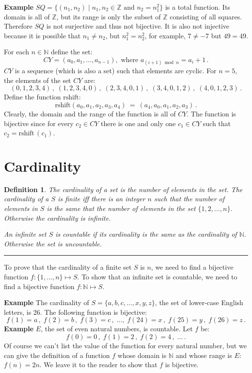 \documentclass[12pt,a4paper]{article}
\newtheorem{definition}[theorem]{Definition}
\newcommand*{\qed}{\hfill\rule[-2pt]{4pt}{10pt}}
\newenvironment{example}{\textbf{Example}}{}
\begin{document}
\begin{example}
$SQ= \{(n_1,n_2)\mid n_1,n_2\in\mathbb{Z} \textrm{\ and\ }  n_2=n_1^2\}$ is a total function. Its domain is all of $\mathbb{Z}$, but its range is
only the subset of $\mathbb{Z}$ consisting of all squares. Therefore
$SQ$ is not surjective and thus not bijective. It is also not injective because it is possible that $n_1 \neq n_2$, but $n_1^2=n_2^2$, for example, $7\neq -7$ but $49=49$.

For each $n\in \mathbb{N}$ define the set:
\[
CY =(a_0,a_1,\ldots,a_{n-1}), \textrm{\ where\ } a_{(i+1)\bmod n}=a_i+1\,.
\]
$CY$ is a sequence (which is also a set) such that elements are cyclic. For $n=5$, the elements of the set $CY$ are:
\[
(0,1,2,3,4)\,,\;(1,2,3,4,0)\,,\;(2,3,4,0,1)\,,\;(3,4,0,1,2)\,,\;(4,0,1,2,3)\,.
\]
Define the function $\textrm{rshift}$:
\[
\textrm{rshift}(a_0,a_1,a_2,a_3,a_4)\:=\:(a_4,a_0,a_1,a_2,a_3)\,.
\]
Clearly, the domain and the range of the function is all of $CY$. The function is bijective since for every $c_2\in CY$ there is one and only one $c_1\in CY$ such that $c_2=\textrm{rshift}\,(c_1)$.
\end{example}


\section{Cardinality}

\begin{definition}
The \emph{cardinality} of a set is the number of
elements in the set. The cardinality of a $S$ is \emph{finite} iff there
is an integer $n$ such that the number of elements in $S$ is the same
that the number of elements in the set \(\{1,2,\ldots,n\}\). Otherwise
the cardinality is \emph{infinite}.

An infinite set $S$ is
\emph{countable} if its cardinality is the same as
the cardinality of $\mathbb{N}$. Otherwise the set is
\emph{uncountable}.\qed
\end{definition}

To prove that the cardinality of a finite set $S$ is $n$, we need to find a bijective function $f: \{1,\ldots,n\}\mapsto S$. To show that an infinite set is countable, we need to find a bijective function $f:\mathbb{N}\mapsto S$.

\begin{example}
The cardinality of $S=\{a,b,c,\ldots,x,y,z\}$, the set of lower-case English letters, is 26. The following function is bijective:
\[
f(1) = a\,,\;f(2) = b\,,\;f(3) = c\,,\;\ldots,\; f(24) = x\,,\;f(25) = y\,,\;f(26) = z\,.
\]
\end{example}
\begin{example}
$E$, the set of even natural numbers, is countable. Let $f$ be:
\[
f(0) = 0\,,\;f(1) = 2\,,\;f(2) = 4\,,\;\ldots\,.
\]
Of course we can't list the value of the function for every natural number, but we can give the definition of a function $f$ whose domain is $\mathbb{N}$ and whose range is $E$: $f(n)=2n$. We leave it to the reader to show that $f$ is bijective.
\end{example}
\end{document}
